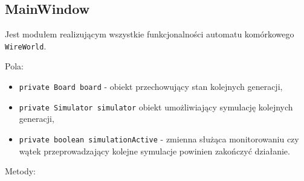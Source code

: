 \documentclass[a4paper,11pt, notitlepage ]{article}
\begin{document}
\subsection{MainWindow}
Jest modułem realizującym wszystkie funkcjonalności automatu komórkowego \verb+WireWorld+.

Pola:
\begin{itemize}
\item \verb+private Board board+ - obiekt przechowujący stan kolejnych generacji,
\item \verb+private Simulator simulator+ obiekt umożliwiający symulację kolejnych generacji,
\item \verb+private boolean simulationActive+ - zmienna służąca monitorowaniu czy wątek przeprowadzający kolejne symulacje powinien zakończyć działanie.
\end{itemize}

Metody:
\end{document}
